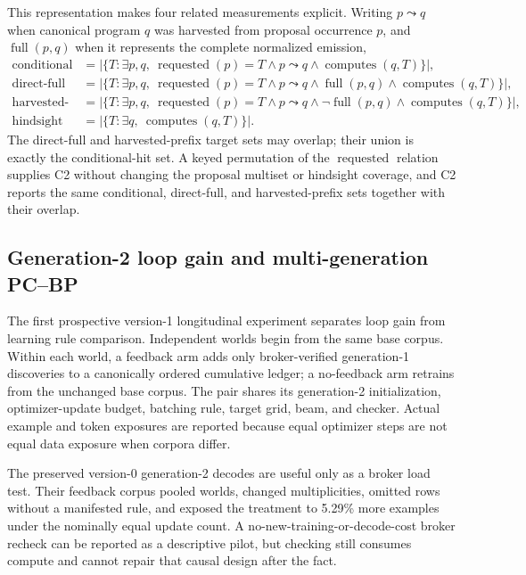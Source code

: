 \documentclass[11pt]{article}
\begin{document}
This representation makes four related measurements explicit.  Writing $p\leadsto q$ when
canonical program $q$ was harvested from proposal occurrence $p$, and
$\operatorname{full}(p,q)$ when it represents the complete normalized emission,
\[
\begin{split}
\text{conditional hits}
  &= \bigl|\{T:\exists p,q,\ \operatorname{requested}(p)=T
                   \land p\leadsto q \land \operatorname{computes}(q,T)\}\bigr|,\\
\text{direct-full hits}
  &= \bigl|\{T:\exists p,q,\ \operatorname{requested}(p)=T
                   \land p\leadsto q \land \operatorname{full}(p,q)
                   \land \operatorname{computes}(q,T)\}\bigr|,\\
\text{harvested-prefix hits}
  &= \bigl|\{T:\exists p,q,\ \operatorname{requested}(p)=T
                   \land p\leadsto q \land \neg\operatorname{full}(p,q)
                   \land \operatorname{computes}(q,T)\}\bigr|,\\
\text{hindsight coverage}
  &= \bigl|\{T:\exists q,\ \operatorname{computes}(q,T)\}\bigr|.
\end{split}
\]
The direct-full and harvested-prefix target sets may overlap; their union is exactly the
conditional-hit set.  A keyed permutation of the $\operatorname{requested}$ relation
supplies C2 without changing the proposal multiset or hindsight coverage, and C2 reports
the same conditional, direct-full, and harvested-prefix sets together with their overlap.

\subsection{Generation-2 loop gain and multi-generation PC--BP}
\label{sec:nmt-multigen}

The first prospective version-1 longitudinal experiment separates loop gain from learning
rule comparison.  Independent worlds begin from the same base corpus.  Within each world,
a feedback arm adds only broker-verified generation-1 discoveries to a canonically ordered
cumulative ledger; a no-feedback arm retrains from the unchanged base corpus.  The pair
shares its generation-2 initialization, optimizer-update budget, batching rule, target
grid, beam, and checker.  Actual example and token exposures are reported because equal
optimizer steps are not equal data exposure when corpora differ.

The preserved version-0 generation-2 decodes are useful only as a broker load test.  Their
feedback corpus pooled worlds, changed multiplicities, omitted rows without a manifested
rule, and exposed the treatment to 5.29\% more examples under the nominally equal update
count.  A no-new-training-or-decode-cost broker recheck can be reported as a descriptive
pilot, but checking still consumes compute and cannot repair that causal design after the
fact.
\end{document}
